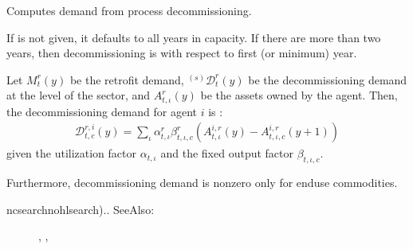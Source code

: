 \documentclass[letterpaper,10pt,english]{sphinxmanual}
\begin{document}
\begin{fulllineitems}
\label{\detokenize{api:muse.quantities.decommissioning_demand}}
Computes demand from process decommissioning.

If  is not given, it defaults to all years in capacity. If there are more than
two years, then decommissioning is with respect to first (or minimum) year.

Let \(M_t^r(y)\) be the retrofit demand, \(^{(s)}\mathcal{D}_t^r(y)\) be the
decommissioning demand at the level of the sector, and \(A^r_{t, \iota}(y)\) be
the assets owned by the agent. Then, the decommissioning demand for agent \(i\)
is :
\begin{equation*}
\begin{split}\mathcal{D}^{r, i}_{t, c}(y) =
    \sum_\iota \alpha_{t, \iota}^r \beta_{t, \iota, c}^r
        \left(A^{i, r}_{t, \iota}(y) - A^{i, r}_{t, \iota, c}(y + 1) \right)\end{split}
\end{equation*}
given the utilization factor \(\alpha_{t, \iota}\) and the fixed output factor
\(\beta_{t, \iota, c}\).

Furthermore, decommissioning demand is non\sphinxhyphen{}zero only for end\sphinxhyphen{}use commodities.
\begin{description}
\item[{ncsearch\sphinxhyphen{}nohlsearch).. SeeAlso:}] \leavevmode
{}, {\hyperref[\detokenize{api:module-muse.quantities}]{}},

\end{description}

\end{fulllineitems}

\end{document}
